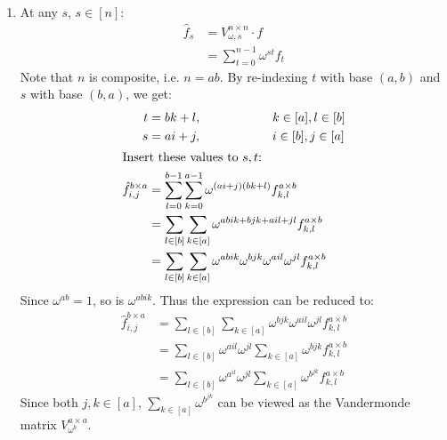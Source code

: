 \documentclass[11pt,a4paper]{article}
\begin{document}
\begin{enumerate}
          \newpage

    \item At any $s$, $s \in [n]$:
          \begin{align*}
              \hat{f}_{s} & = V_{\omega, s}^{n \times n} \cdot f  \\
                          & = \sum_{t = 0}^{n - 1} \omega^{st}f_t
          \end{align*}
          Note that $n$ is composite, i.e. $n = ab$.
          By re-indexing $t$ with base $(a, b)$ and $s$ with base $(b, a)$, we get:
          \begin{align*}
              t                           & = bk + l, \hspace{2cm} k \in [a], l \in [b]                                                                   \\
              s                           & = ai + j, \hspace{2cm} i \in [b], j \in [a]                                                                   \\
              \intertext{Insert these values to $s, t$:}
              \hat{f}^{b \times a}_{i, j} & = \sum_{l = 0}^{b - 1} \sum_{k = 0}^{a - 1} \omega^{(ai + j)(bk + l)} f_{k, l}^{a \times b}                   \\
                                          & = \sum_{l \in [b]} \sum_{k \in [a]} \omega^{abik + bjk + ail + jl} f_{k, l}^{a \times b}                      \\
                                          & = \sum_{l \in [b]} \sum_{k \in [a]} \omega^{abik} \omega^{bjk} \omega^{ail} \omega^{jl} f_{k, l}^{a \times b}
          \end{align*}
          Since $\omega^{ab} = 1$, so is $\omega^{abik}$. Thus the expression can be reduced to:
          \begin{align*}
              \hat{f}_{i, j}^{b \times a} & = \sum_{l \in [b]} \sum_{k \in [a]} \omega^{bjk}\omega^{ail}\omega^{jl}  f_{k, l}^{a \times b}       \\
                                          & = \sum_{l \in [b]} \omega^{ail}\omega^{jl} \sum_{k \in [a]} \omega^{bjk} f_{k, l}^{a \times b}       \\
                                          & = \sum_{l \in [b]} \omega^{a^{il}}\omega^{jl} \sum_{k \in [a]} \omega^{b^{jk}} f_{k, l}^{a \times b}
          \end{align*}
          Since both $j, k \in [a]$, $ \sum_{k \in [a]}\omega^{b^{jk}}$ can be viewed as the Vandermonde matrix $V_{\omega^b}^{a \times a}$.

\end{enumerate}
\end{document}

